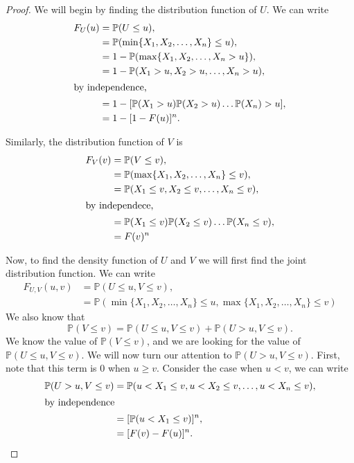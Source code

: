 \documentclass{article}
\renewcommand{\P}[1]{\mathbb{P}(#1)}
\begin{document}
\begin{proof}
    We will begin by finding the distribution function of $U$.
    We can write
    \begin{align*}
        F_U(u) & = \P{U \leq u},                                \\
               & = \P{\min\{X_1,X_2,\dots,X_n\} \leq u},        \\
               & = 1 - \P{\max\{X_1,X_2,\dots,X_n > u\}},       \\
               & = 1 - \P{X_1 > u, X_2 > u,\dots,X_n > u},      \\
        \intertext{by independence,}
               & = 1 -[\P{X_1 > u}\P{X_2 > u}\dots\P{X_n} > u], \\
               & = 1 - [1 - F(u)]^n.
    \end{align*}

    Similarly, the distribution function of $V$ is
    \begin{align*}
        F_V(v) & = \P{V \leq v},                                    \\
               & = \P{\max\{X_1,X_2,\dots,X_n\} \leq v},            \\
               & = \P{X_1 \leq v, X_2 \leq v,\dots,X_n \leq v},     \\
        \intertext{by independece,}
               & = \P{X_1 \leq v}\P{X_2 \leq v}\dots\P{X_n \leq v}, \\
               & = F(v)^n
    \end{align*}

    Now, to find the density function of $U$ and $V$ we will first
    find the joint distribution function. We can write
    \begin{align*}
        F_{U,V}(u,v) & = \P{U \leq u, V \leq v},              \\
                     & = \P{\min\{X_1,X_2,\dots,X_n\} \leq u,
            \max\{X_1,X_2,\dots,X_n\} \leq v}
    \end{align*}
    We also know that
    \begin{equation}
        \P{V \leq v} = \P{U\leq u, V \leq v} + \P{U > u, V \leq v}.
    \end{equation}
    We know the value of $\P{V \leq v}$, and we are looking for the value
    of $\P{U\leq u, V \leq v}$. We will now turn our attention to
    $\P{U > u, V \leq v}$. First, note that this term is $0$ when
    $u \geq v$. Consider the case when $u < v$, we can write
    \begin{align*}
        \P{U > u, V \leq v} & = \P{u < X_1 \leq v, u < X_2 \leq v,\dots, u < X_n \leq v}, \\
        \intertext{by independence}
                            & = [\P{u < X_1 \leq v}]^n,                                   \\
                            & = [F(v) - F(u)]^n.
    \end{align*}


\end{proof}
\end{document}
